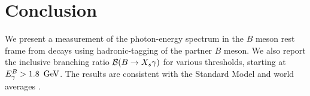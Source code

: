 \section{Conclusion}

We present a measurement of the photon-energy spectrum in the $B$ meson rest frame from \BtoXsgamma decays using hadronic-tagging of the partner $B$ meson. We also report the inclusive branching ratio $\mathcal{B}({B\rightarrow X_{s} \gamma})$ for various thresholds, starting at ${E^B_{\gamma}}>1.8~\mathrm{\,Ge\kern -0.1em V}$. The results are consistent with the Standard Model and world averages \cite{HFLAV:2019otj}. 